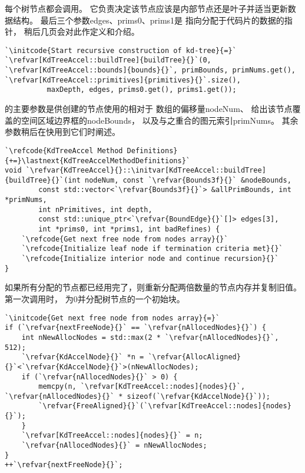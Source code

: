 每个树节点都会调用。
它负责决定该节点应该是内部节点还是叶子并适当更新数据结构。
最后三个参数{\ttfamily edges}、{\ttfamily prims0}、{\ttfamily prims1}是
指向分配于代码片的数据的指针，
稍后几页会对此作定义和介绍。
\begin{lstlisting}
`\initcode{Start recursive construction of kd-tree}{=}`
`\refvar[KdTreeAccel::buildTree]{buildTree}{}`(0, `\refvar[KdTreeAccel::bounds]{bounds}{}`, primBounds, primNums.get(), `\refvar[KdTreeAccel::primitives]{primitives}{}`.size(), 
          maxDepth, edges, prims0.get(), prims1.get());
\end{lstlisting}

的主要参数是供创建的节点使用的相对于
数组的偏移量{\ttfamily nodeNum}、
给出该节点覆盖的空间区域边界框的{\ttfamily nodeBounds}，
以及与之重合的图元索引{\ttfamily primNums}。
其余参数稍后在快用到它们时阐述。
\begin{lstlisting}
`\refcode{KdTreeAccel Method Definitions}{+=}\lastnext{KdTreeAccelMethodDefinitions}`
void `\refvar{KdTreeAccel}{}::\initvar[KdTreeAccel::buildTree]{buildTree}{}`(int nodeNum, const `\refvar{Bounds3f}{}` &nodeBounds,
        const std::vector<`\refvar{Bounds3f}{}`> &allPrimBounds, int *primNums,
        int nPrimitives, int depth,
        const std::unique_ptr<`\refvar{BoundEdge}{}`[]> edges[3], 
        int *prims0, int *prims1, int badRefines) {
    `\refcode{Get next free node from nodes array}{}`
    `\refcode{Initialize leaf node if termination criteria met}{}`
    `\refcode{Initialize interior node and continue recursion}{}`
}
\end{lstlisting}

如果所有分配的节点都已经用完了，则重新分配两倍数量的节点内存并复制旧值。
第一次调用时，
为0并分配树节点的一个初始块。
\begin{lstlisting}
`\initcode{Get next free node from nodes array}{=}`
if (`\refvar{nextFreeNode}{}` == `\refvar{nAllocedNodes}{}`) {
    int nNewAllocNodes = std::max(2 * `\refvar{nAllocedNodes}{}`, 512);
    `\refvar{KdAccelNode}{}` *n = `\refvar{AllocAligned}{}`<`\refvar{KdAccelNode}{}`>(nNewAllocNodes);
    if (`\refvar{nAllocedNodes}{}` > 0) {
        memcpy(n, `\refvar[KdTreeAccel::nodes]{nodes}{}`, `\refvar{nAllocedNodes}{}` * sizeof(`\refvar{KdAccelNode}{}`));
        `\refvar{FreeAligned}{}`(`\refvar[KdTreeAccel::nodes]{nodes}{}`);
    }
    `\refvar[KdTreeAccel::nodes]{nodes}{}` = n;
    `\refvar{nAllocedNodes}{}` = nNewAllocNodes;
}
++`\refvar{nextFreeNode}{}`;
\end{lstlisting}

